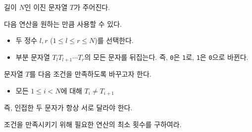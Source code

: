 길이 $N$인 이진 문자열 $T$가 주어진다.

다음 연산을 원하는 만큼 사용할 수 있다.

\begin{itemize}
    \item 두 정수 $l, r$ ($1 \le l \le r \le N$)를 선택한다.
    \item 부분 문자열 $T_l T_{l+1} \cdots T_r$의 모든 문자를 뒤집는다.
    즉, \texttt{0}은 \texttt{1}로, \texttt{1}은 \texttt{0}으로 바뀐다.
\end{itemize}

문자열 $T$를 다음 조건을 만족하도록 바꾸고자 한다.

\begin{itemize}
    \item 모든 $1 \le i < N$에 대해 $T_i \ne T_{i+1}$
\end{itemize}

즉, 인접한 두 문자가 항상 서로 달라야 한다.

조건을 만족시키기 위해 필요한 연산의 최소 횟수를 구하여라.
